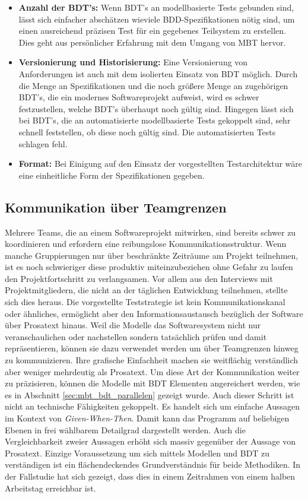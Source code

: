 \begin{itemize}
\item \textbf{Anzahl der \Gls{BDT}'s:} Wenn \Gls{BDT}'s  an modellbasierte Tests gebunden sind, lässt sich einfacher abschätzen wieviele \Gls{BDD}-Spezifikationen nötig sind, um einen ausreichend präzisen Test für ein gegebenes Teilsystem zu erstellen. Dies geht aus persönlicher Erfahrung mit dem Umgang von \Gls{MBT} hervor.
\item \textbf{Versionierung und Historisierung:} Eine Versionierung von Anforderungen ist auch mit dem isolierten Einsatz von \Gls{BDT} möglich. Durch die Menge an Spezifikationen und die noch größere Menge an zugehörigen \Gls{BDT}'s, die ein modernes Softwareprojekt aufweist, wird es schwer festzustellen, welche \Gls{BDT}'s überhaupt noch gültig sind. Hingegen lässt sich bei \Gls{BDT}'s, die an automatisierte modellbasierte Tests gekoppelt sind, sehr schnell feststellen, ob diese noch gültig sind. Die automatisierten Tests schlagen fehl.
\item \textbf{Format:} Bei Einigung auf den Einsatz der vorgestellten Testarchitektur wäre eine einheitliche Form der Spezifikationen gegeben.
\end{itemize}

\subsection{Kommunikation über Teamgrenzen}
Mehrere Teams, die an einem Softwareprojekt mitwirken, sind bereits schwer zu koordinieren und erfordern eine reibungslose Kommunikationsstruktur. Wenn manche Gruppierungen nur über beschränkte Zeiträume am Projekt teilnehmen, ist es noch schwieriger diese produktiv miteinzubeziehen ohne Gefahr zu laufen den Projektfortschritt zu verlangsamen. Vor allem aus den Interviews mit Projektmitgliedern, die nicht an der täglichen Entwicklung teilnehmen, stellte sich dies heraus. Die vorgestellte Teststrategie ist kein Kommunikationskanal oder ähnliches, ermöglicht aber den Informationsaustausch bezüglich der Software über Prosatext hinaus. Weil die Modelle das Softwaresystem nicht nur veranschaulichen oder nachstellen sondern tatsächlich prüfen und damit repräsentieren, können sie dazu verwendet werden um über Teamgrenzen hinweg zu kommunizieren. Ihre grafische Einfachheit machen sie weitflächig verständlich aber weniger mehrdeutig als Prosatext. Um diese Art der Kommunikation weiter zu präzisieren, können die Modelle mit \Gls{BDT} Elementen angereichert werden, wie es in Abschnitt \ref{sec:mbt_bdt_parallelen} gezeigt wurde. Auch dieser Schritt ist nicht an technische Fähigkeiten gekoppelt. Es handelt sich um einfache Aussagen im Kontext von \textit{Given-When-Then}. Damit kann das Programm auf beliebigen Ebenen in frei wählbarem Detailgrad dargestellt werden. Auch die Vergleichbarkeit zweier Aussagen erhöht sich massiv gegenüber der Aussage von Prosatext. Einzige Voraussetzung um sich mittels Modellen und BDT zu verständigen ist ein flächendeckendes Grundverständnis für beide Methodiken. In der Fallstudie hat sich gezeigt, dass dies in einem Zeitrahmen von einem halben Arbeitstag erreichbar ist.

